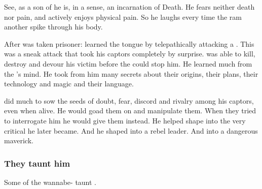 See, as a son of \KhothSell{} he is, in a sense, an incarnation of Death. He fears neither death nor pain, and actively enjoys physical pain. So he laughs every time the \resphain{} ram another spike through his body.

After \Nexagglachel was taken prisoner:
\Nexagglachel learned the \resphan tongue by telepathically attacking a \resphan.
This was a sneak attack that took his captors completely by surprise.
\Nexagglachel was able to kill, destroy and devour his victim before the \resphain could stop him.
He learned much from the \resphan's mind.
He took from him many secrets about their origins, their plans, their technology and magic and their language.

\Nexagglachel did much to sow the seeds of doubt, fear, discord and rivalry among his \resphan captors, even when alive.
He would goad them on and manipulate them.
When they tried to interrogate him he would give them  instead.
He helped shape \Azraid into the very critical \resphan he later became.
And he shaped \Sithiyacaan into a rebel leader.
And \Shiaraid into a dangerous maverick.





\subsubsection{They taunt him}
Some of the wannabe-\Satharioth{} taunt \Nexagglachel. 






